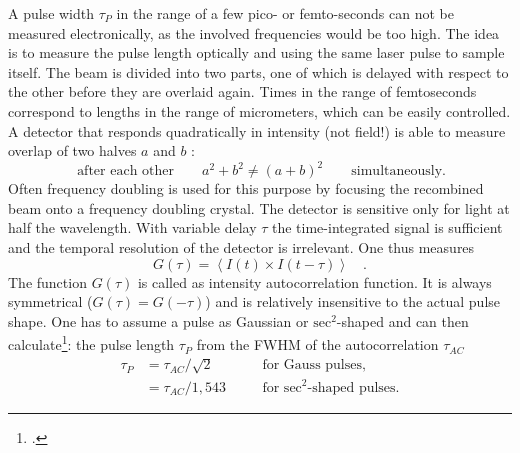 A pulse width $\tau_P$ in the range of a few pico- or femto-seconds can not be measured electronically, as the involved frequencies  would be too high. The idea is to measure the pulse length optically and using the same laser pulse to sample itself. The beam is divided into two parts, one of which is delayed with respect to the other before they are overlaid again.
 Times in the 
range of femtoseconds correspond to lengths in the range of
micrometers, which can be easily controlled. A detector that responds quadratically in intensity (not field!) is able to measure  overlap of two halves $a$ and $b$ :
\begin{equation}
 \ \text{after each other} \qquad a^2 + b^2 \neq (a+b)^2 \qquad
 \text{simultaneously.}
\end{equation}
Often  frequency doubling is used for this purpose by focusing the
recombined beam onto a frequency doubling crystal.
The detector is sensitive only for light at half the wavelength. With variable delay $\tau$ the time-integrated signal is sufficient and  the temporal resolution
of the detector is  irrelevant. One thus measures
\begin{equation}
  G(\tau) = \left< I(t) \times I(t-\tau) \right> \quad.
\end{equation}
The function $G(\tau)$ is called as intensity autocorrelation function. It is always symmetrical ($G(\tau) = G(-\tau)$) and
is relatively insensitive to the actual pulse shape.  One has to assume a pulse as Gaussian
 or
$\text{sec}^2$-shaped and can then calculate\footcite{DielsRudolph1996}: the pulse length $\tau_{P} $ from the 
FWHM of the autocorrelation
$\tau_{AC}$ 
\begin{align}
  \tau_{P} &= \tau_{AC} / \sqrt{2} &\quad& \text{for Gauss pulses,} \\
           &= \tau_{AC} / 1,543 && \text{for $\text{sec}^2$-shaped pulses.}
\end{align}

		
\printbibliography[segment=\therefsegment,heading=subbibliography]

